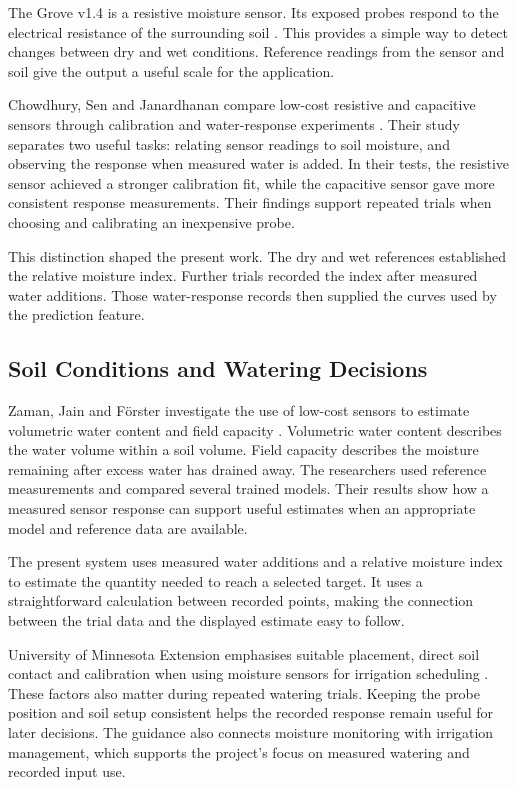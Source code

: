 \documentclass[11pt,a4paper]{article}
\begin{document}
The Grove v1.4 is a resistive moisture sensor. Its exposed probes respond to the electrical resistance of the surrounding soil \cite{ref6}. This provides a simple way to detect changes between dry and wet conditions. Reference readings from the sensor and soil give the output a useful scale for the application.

Chowdhury, Sen and Janardhanan compare low-cost resistive and capacitive sensors through calibration and water-response experiments \cite{ref2}. Their study separates two useful tasks: relating sensor readings to soil moisture, and observing the response when measured water is added. In their tests, the resistive sensor achieved a stronger calibration fit, while the capacitive sensor gave more consistent response measurements. Their findings support repeated trials when choosing and calibrating an inexpensive probe.

This distinction shaped the present work. The dry and wet references established the relative moisture index. Further trials recorded the index after measured water additions. Those water-response records then supplied the curves used by the prediction feature.

\subsection{Soil Conditions and Watering Decisions}

Zaman, Jain and F{\"o}rster investigate the use of low-cost sensors to estimate volumetric water content and field capacity \cite{ref3}. Volumetric water content describes the water volume within a soil volume. Field capacity describes the moisture remaining after excess water has drained away. The researchers used reference measurements and compared several trained models. Their results show how a measured sensor response can support useful estimates when an appropriate model and reference data are available.

The present system uses measured water additions and a relative moisture index to estimate the quantity needed to reach a selected target. It uses a straightforward calculation between recorded points, making the connection between the trial data and the displayed estimate easy to follow.

University of Minnesota Extension emphasises suitable placement, direct soil contact and calibration when using moisture sensors for irrigation scheduling \cite{ref4}. These factors also matter during repeated watering trials. Keeping the probe position and soil setup consistent helps the recorded response remain useful for later decisions. The guidance also connects moisture monitoring with irrigation management, which supports the project's focus on measured watering and recorded input use.
\end{document}

